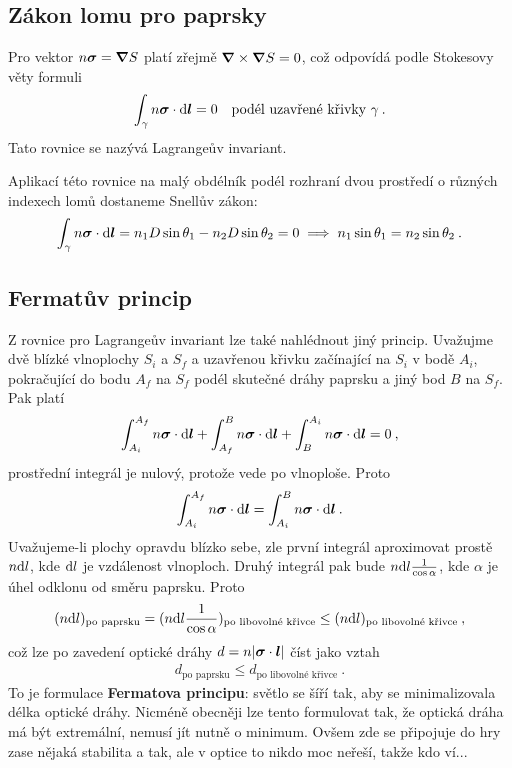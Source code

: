 \subsection{Zákon lomu pro paprsky}
Pro vektor $n \boldsymbol{\sigma} = \boldsymbol{\nabla} S$ platí zřejmě $\boldsymbol{\nabla} \times \boldsymbol{\nabla} S = 0$, což odpovídá podle Stokesovy věty formuli \begin{align}
    \int_\gamma n \boldsymbol{\sigma} \cdot \mathrm{d} \boldsymbol{l} = 0 \quad \text{podél uzavřené křivky } \gamma \:.
\end{align}
Tato rovnice se nazývá Lagrangeův invariant.

Aplikací této rovnice na malý obdélník podél rozhraní dvou prostředí o různých indexech lomů dostaneme Snellův zákon: \begin{align}
    \int_\gamma n \boldsymbol{\sigma} \cdot \mathrm{d} \boldsymbol{l} = n_1 D \sin \theta_1 - n_2 D \sin \theta_2 = 0 \implies n_1 \sin \theta_1 = n_2 \sin \theta_2 \:.
\end{align}

\subsection{Fermatův princip}

Z rovnice pro Lagrangeův invariant lze také nahlédnout jiný princip. Uvažujme dvě blízké vlnoplochy $S_i$ a $S_f$ a uzavřenou křivku začínající na $S_i$ v bodě $A_i$, pokračující do bodu $A_f$ na $S_f$ podél skutečné dráhy paprsku a jiný bod $B$ na $S_f$. Pak platí \begin{align}
    \int_{A_i}^{A_f} n \boldsymbol{\sigma} \cdot \mathrm{d} \boldsymbol{l} + \int_{A_f}^{B} n \boldsymbol{\sigma} \cdot \mathrm{d} \boldsymbol{l} + \int_{B}^{A_i} n \boldsymbol{\sigma} \cdot \mathrm{d} \boldsymbol{l} = 0 \:,
\end{align}
prostřední integrál je nulový, protože vede po vlnoploše. Proto \begin{align}
    \int_{A_i}^{A_f} n \boldsymbol{\sigma} \cdot \mathrm{d} \boldsymbol{l} = \int_{A_i}^{B} n \boldsymbol{\sigma} \cdot \mathrm{d} \boldsymbol{l} \:.
\end{align}
Uvažujeme-li plochy opravdu blízko sebe, zle první integrál aproximovat prostě $n \mathrm{d} l$, kde $\mathrm{d} l$ je vzdálenost vlnoploch. Druhý integrál pak bude $n \mathrm{d} l \frac{1}{\cos \alpha}$, kde $\alpha$ je úhel odklonu od směru paprsku. Proto \begin{align}
    (n \mathrm{d} l)_{\text{po paprsku}} = (n \mathrm{d} l \frac{1}{\cos \alpha})_{\text{po libovolné křivce}} \leq (n \mathrm{d} l)_{\text{po libovolné křivce}} \:,
\end{align}
což lze po zavedení optické dráhy $d = n |\boldsymbol{\sigma} \cdot \boldsymbol{l}|$ číst jako vztah \begin{align}
    \boxed{ d_{\text{po paprsku}} \leq d_{\text{po libovolné křivce}} } \:.
\end{align}
To je formulace \textbf{Fermatova principu}: světlo se šíří tak, aby se minimalizovala délka optické dráhy. Nicméně obecněji lze tento formulovat tak, že optická dráha má být extremální, nemusí jít nutně o minimum. Ovšem zde se připojuje do hry zase nějaká stabilita a tak, ale v optice to nikdo moc neřeší, takže kdo ví...

